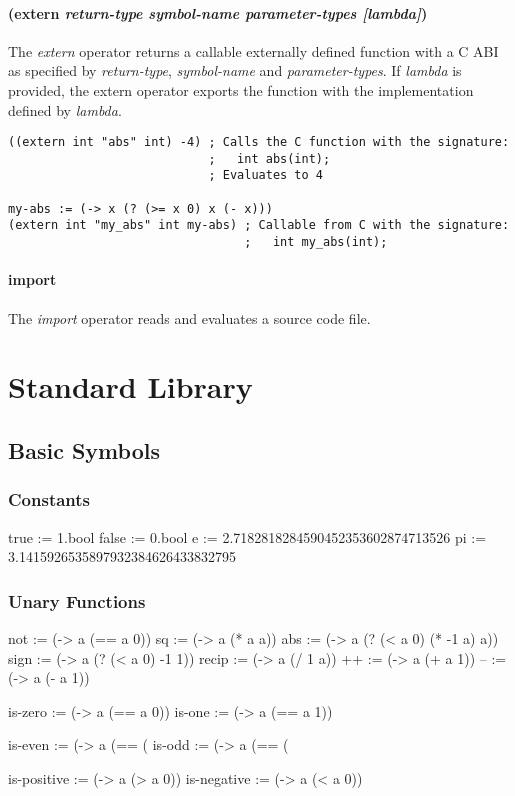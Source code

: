 \documentclass[twoside=false, numbers=noenddot]{scrbook}
\newenvironment{likely}
{ \verbatim }
{ \endverbatim }
\newcommand{\dindex}[1]{\emph{#1}\index{#1}}
\newcommand{\pindex}[1]{#1\index{#1}}
\begin{document}
\subsection{(extern \emph{return-type symbol-name parameter-types [lambda]})}
The \dindex{extern} operator returns a callable externally defined function with a C ABI as specified by \emph{return-type}, \emph{symbol-name} and \emph{parameter-types}.
If \emph{lambda} is provided, the \pindex{extern} operator exports the function with the implementation defined by \emph{lambda}.

\begin{verbatim}
((extern int "abs" int) -4) ; Calls the C function with the signature:
                            ;   int abs(int);
                            ; Evaluates to 4

my-abs := (-> x (? (>= x 0) x (- x)))
(extern int "my_abs" int my-abs) ; Callable from C with the signature:
                                 ;   int my_abs(int);
\end{verbatim}

\subsection{import}
The \dindex{import} operator reads and evaluates a source code file.

\part{Standard Library}
\chapter{Basic Symbols}
\section{Constants}
\begin{likely}
true  := 1.bool
false := 0.bool
e  := 2.7182818284590452353602874713526
pi := 3.1415926535897932384626433832795
\end{likely}

\section{Unary Functions}
\begin{likely}
not   := (-> a (== a 0))
sq    := (-> a (* a a))
abs   := (-> a (? (< a 0) (* -1 a) a))
sign  := (-> a (? (< a 0) -1 1))
recip := (-> a (/ 1 a))
++    := (-> a (+ a 1))
--    := (-> a (- a 1))

is-zero := (-> a (== a 0))
is-one  := (-> a (== a 1))

is-even := (-> a (== (%
is-odd  := (-> a (== (%

is-positive := (-> a (> a 0))
is-negative := (-> a (< a 0))
\end{likely}
\end{document}
